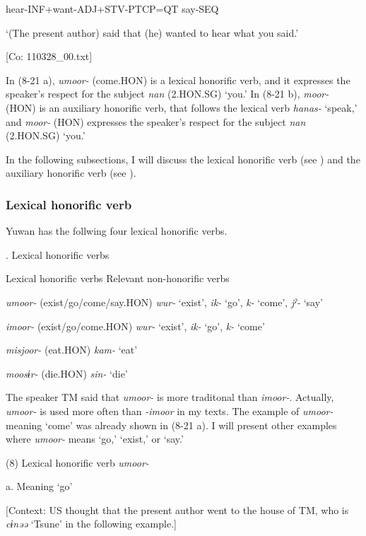       hear-INF+want-ADJ+STV-PTCP=QT  say-SEQ

      ‘(The present author) said that (he) wanted to hear what you said.’

      [Co: 110328\_00.txt]

In (8-21 a), \textit{umoor-} (come.HON) is a lexical honorific verb, and it expresses the speaker’s respect for the subject \textit{nan} (2.HON.SG) ‘you.’ In (8-21 b), \textit{moor-} (HON) is an auxiliary honorific verb, that follows the lexical verb \textit{hanas-} ‘speak,’ and \textit{moor-} (HON) expresses the speaker’s respect for the subject \textit{nan} (2.HON.SG) ‘you.’

  In the following subsections, I will discuss the lexical honorific verb (see ) and the auxiliary honorific verb (see ).

\subsubsection{Lexical honorific verb}

Yuwan has the follwing four lexical honorific verbs.

\begin{styleBeschriftung}
\textmd{}\textmd{. Lexical honorific verbs}
\end{styleBeschriftung}

Lexical honorific verbs  Relevant non-honorific verbs

\textit{umoor-} (exist/go/come/say.HON)  \textit{wur-} ‘exist’, \textit{ik-} ‘go’, \textit{k-} ‘come’, \textit{jˀ-} ‘say’

\textit{imoor-} (exist/go/come.HON)  \textit{wur-} ‘exist’, \textit{ik-} ‘go’, \textit{k-} ‘come’

\textit{misjoor-} (eat.HON)  \textit{kam-} ‘eat’

\textit{moosɨr-} (die.HON)  \textit{sin-} ‘die’

The speaker TM said that \textit{umoor-} is more traditonal than \textit{imoor-}. Actually, \textit{umoor-} is used more often than \textit{{}-imoor} in my texts. The example of \textit{umoor-} meaning ‘come’ was already shown in (8-21 a). I will present other examples where \textit{umoor-} means ‘go,’ ‘exist,’ or ‘say.’

(8)  Lexical honorific verb \textit{umoor-}

  a.  Meaning ‘go’

    [Context: US thought that the present author went to the house of TM, who is \textit{cɨnəə} ‘Tsune’ in the following example.]

